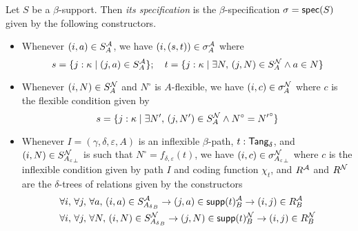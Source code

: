 \begin{definition}
  \label{def:StrSupport.spec}
  Let \( S \) be a \( \beta \)-support.
  Then \emph{its specification} is the \( \beta \)-specification \( \sigma = \operatorname{\mathsf{spec}}(S) \) given by the following constructors.
  \begin{itemize}
    \item Whenever \( (i, a) \in S_A^{\mathcal A} \), we have \( (i, (s, t)) \in \sigma_A^{\mathcal A} \) where
    \[ s = \{ j : \kappa \mid (j, a) \in S_A^{\mathcal A} \};\quad t = \{ j : \kappa \mid \exists N,\, (j, N) \in S_A^{\mathcal N} \wedge a \in N \} \]
    \item Whenever \( (i, N) \in S_A^{\mathcal N} \) and \( N^\circ \) is \( A \)-flexible, we have \( (i, c) \in \sigma_A^{\mathcal N} \) where \( c \) is the flexible condition given by
    \[ s = \{ j : \kappa \mid \exists N',\, (j, N') \in S_A^{\mathcal N} \wedge N^\circ = {N'}^\circ \} \]
    \item Whenever \( I = (\gamma,\delta,\varepsilon,A) \) is an inflexible \( \beta \)-path, \( t : \mathsf{Tang}_\delta \), and \( (i, N) \in S_{{A_\varepsilon}_\bot}^{\mathcal N} \) is such that \( N^\circ = f_{\delta,\varepsilon}(t) \), we have \( (i, c) \in \sigma_{{A_\varepsilon}_\bot}^{\mathcal N} \) where \( c \) is the inflexible condition given by path \( I \) and coding function \( \chi_t \), and \( R^{\mathcal A} \) and \( R^{\mathcal N} \) are the \( \delta \)-trees of relations given by the constructors
    \begin{align*}
      &\forall i,\, \forall j,\, \forall a,\, (i, a) \in S_{{A_\delta}_B}^{\mathcal A} \to (j, a) \in \operatorname{\mathsf{supp}}(t)_B^{\mathcal A} \to (i, j) \in R_B^{\mathcal A} \\
      &\forall i,\, \forall j,\, \forall N,\, (i, N) \in S_{{A_\delta}_B}^{\mathcal N} \to (j, N) \in \operatorname{\mathsf{supp}}(t)_B^{\mathcal N} \to (i, j) \in R_B^{\mathcal N}
    \end{align*}
  \end{itemize}
\end{definition}
